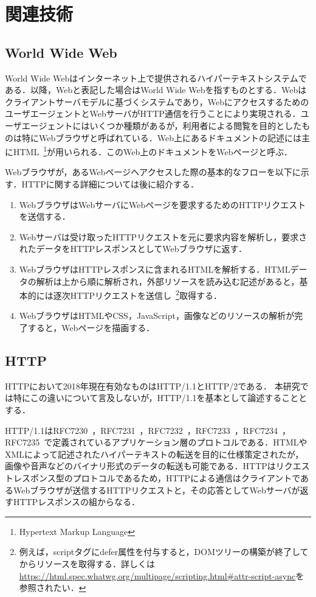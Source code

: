 \newpage
\section{関連技術}
\subsection{World Wide Web}
World Wide Webはインターネット上で提供されるハイパーテキストシステムである．以降，Webと表記した場合はWorld Wide Webを指すものとする．Webはクライアントサーバモデルに基づくシステムであり，WebにアクセスするためのユーザエージェントとWebサーバがHTTP通信を行うことにより実現される．ユーザエージェントにはいくつか種類があるが，利用者による閲覧を目的としたものは特にWebブラウザと呼ばれている．Web上にあるドキュメントの記述には主にHTML~\footnote{Hypertext Markup Language}が用いられる．このWeb上のドキュメントをWebページと呼ぶ．

Webブラウザが，あるWebページへアクセスした際の基本的なフローを以下に示す．HTTPに関する詳細については後に紹介する．

\begin{enumerate}
\item WebブラウザはWebサーバにWebページを要求するためのHTTPリクエストを送信する．
\item Webサーバは受け取ったHTTPリクエストを元に要求内容を解析し，要求されたデータをHTTPレスポンスとしてWebブラウザに返す．
\item WebブラウザはHTTPレスポンスに含まれるHTMLを解析する．HTMLデータの解析は上から順に解析され，外部リソースを読み込む記述があると，基本的には逐次HTTPリクエストを送信し~\footnote{例えば，scriptタグにdefer属性を付与すると，DOMツリーの構築が終了してからリソースを取得する．詳しくは\url{https://html.spec.whatwg.org/multipage/scripting.html\#attr-script-async}を参照されたい．}取得する．
\item WebブラウザはHTMLやCSS，JavaScript，画像などのリソースの解析が完了すると，Webページを描画する．
\end{enumerate}
\subsection{HTTP}
HTTPにおいて2018年現在有効なものはHTTP/1.1とHTTP/2である．
本研究では特にこの違いについて言及しないが，HTTP/1.1を基本として論述することとする．

HTTP/1.1はRFC7230~\cite{rfc7230}，RFC7231~\cite{rfc7231}，RFC7232~\cite{rfc7232}，RFC7233~\cite{rfc7233}，RFC7234~\cite{rfc7234}，RFC7235~\cite{rfc7235}で定義されているアプリケーション層のプロトコルである．HTMLやXMLによって記述されたハイパーテキストの転送を目的に仕様策定されたが，画像や音声などのバイナリ形式のデータの転送も可能である．HTTPはリクエストレスポンス型のプロトコルであるため，HTTPによる通信はクライアントであるWebブラウザが送信するHTTPリクエストと，その応答としてWebサーバが返すHTTPレスポンスの組からなる．

